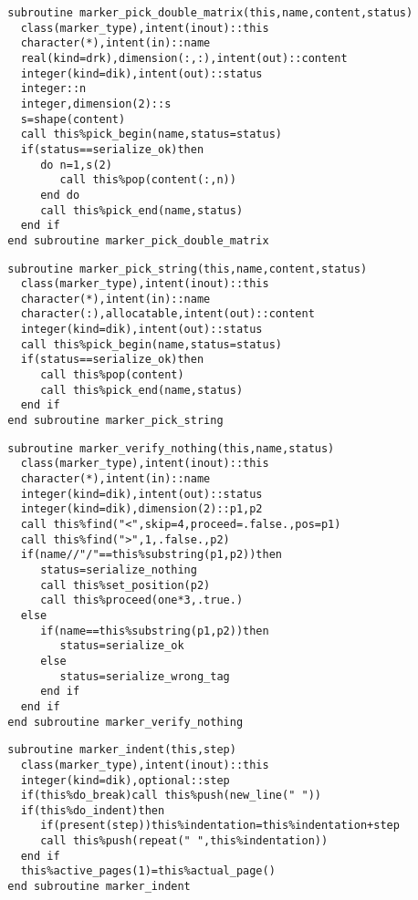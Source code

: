 \begin{Verbatim}
  subroutine marker_pick_double_matrix(this,name,content,status)
    class(marker_type),intent(inout)::this
    character(*),intent(in)::name
    real(kind=drk),dimension(:,:),intent(out)::content
    integer(kind=dik),intent(out)::status
    integer::n
    integer,dimension(2)::s
    s=shape(content)
    call this%pick_begin(name,status=status)
    if(status==serialize_ok)then
       do n=1,s(2)
          call this%pop(content(:,n))
       end do
       call this%pick_end(name,status)
    end if
  end subroutine marker_pick_double_matrix
\end{Verbatim}

\begin{Verbatim}
  subroutine marker_pick_string(this,name,content,status)
    class(marker_type),intent(inout)::this
    character(*),intent(in)::name
    character(:),allocatable,intent(out)::content
    integer(kind=dik),intent(out)::status
    call this%pick_begin(name,status=status)
    if(status==serialize_ok)then
       call this%pop(content)
       call this%pick_end(name,status)
    end if
  end subroutine marker_pick_string
\end{Verbatim}
  
\begin{Verbatim}
  subroutine marker_verify_nothing(this,name,status)
    class(marker_type),intent(inout)::this
    character(*),intent(in)::name
    integer(kind=dik),intent(out)::status
    integer(kind=dik),dimension(2)::p1,p2
    call this%find("<",skip=4,proceed=.false.,pos=p1)
    call this%find(">",1,.false.,p2)
    if(name//"/"==this%substring(p1,p2))then
       status=serialize_nothing
       call this%set_position(p2)
       call this%proceed(one*3,.true.)
    else
       if(name==this%substring(p1,p2))then
          status=serialize_ok
       else
          status=serialize_wrong_tag
       end if
    end if
  end subroutine marker_verify_nothing
\end{Verbatim}

\begin{Verbatim}
  subroutine marker_indent(this,step)
    class(marker_type),intent(inout)::this
    integer(kind=dik),optional::step
    if(this%do_break)call this%push(new_line(" "))
    if(this%do_indent)then
       if(present(step))this%indentation=this%indentation+step
       call this%push(repeat(" ",this%indentation))
    end if
    this%active_pages(1)=this%actual_page()
  end subroutine marker_indent
\end{Verbatim}

